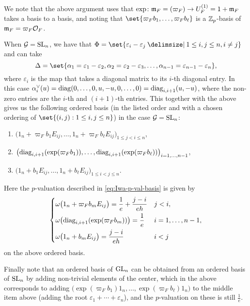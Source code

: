 We note that the above argument uses that $\exp \colon \mathfrak{m}_{F} = (\varpi_{F}) \to U_{F}^{(1)} = 1 + \mathfrak{m}_{F}$ takes a basis to a basis, and noting that $\set{ \varpi_{F}b_{1}, \dotsc, \varpi_{F}b_{\ell} }$ is a $\mathbb{Z}_{p}$-basis of $\mathfrak{m}_{F} = \varpi_{F}\mathcal{O}_{F}$. %

When $\mathcal{G} = \operatorname{SL}_{n}$, we have that $\Phi = \set{ \varepsilon_{i}-\varepsilon_{j} \given 1 \leq i,j \leq n, i\neq j }$ and can take
\begin{equation*}
  \Delta = \set{\alpha_{1}=\varepsilon_{1}-\varepsilon_{2}, \alpha_{2}=\varepsilon_{2}-\varepsilon_{3}, \dotsc, \alpha_{n-1}=\varepsilon_{n-1}-\varepsilon_{n}},
\end{equation*}
where $\varepsilon_{i}$ is the map that takes a diagonal matrix to its $i$-th diagonal entry. In this case $\alpha_{i}^{\vee}(u) = \operatorname{diag}(0,\dotsc,0,u,-u,0,\dotsc,0) = \operatorname{diag}_{i,i+1}(u,-u)$, where the non-zero entries are the $i$-th and $(i+1)$-th entries. This together with the above gives us the following ordered basis (in the listed order and with a chosen ordering of $\set{ (i,j) : 1 \leq i,j \leq n }$) in the case $\mathcal{G} = \operatorname{SL}_{n}$:
\begin{enumerate}[$\bullet$]
  \item $\bigl( 1_{n}+\varpi_{F}b_{1}E_{ij}, \dotsc, 1_{n}+\varpi_{F}b_{\ell}E_{ij} \bigr)_{1 \leq j < i \leq n}$,
  \item $\bigl( \operatorname{diag}_{i,i+1}(\exp(\varpi_{F}b_{1})), \dotsc, \operatorname{diag}_{i,i+1}(\exp(\varpi_{F}b_{\ell})) \bigr)_{i=1,\dotsc,n-1}$,
  \item $\bigl( 1_{n}+b_{1}E_{ij}, \dotsc, 1_{n}+b_{\ell}E_{ij} \bigr)_{1 \leq i < j \leq n}$.
\end{enumerate}
Here the $p$-valuation described in \eqref{eq:Iwa-p-val-basis} is given by
\begin{equation}\label{eq:Iwa-p-val-basis-SLn}
  \begin{dcases}
    \omega\bigl( 1_{n} + \varpi_{F}b_{m}E_{ij} \bigr) = \frac{1}{e} + \frac{j-i}{eh} & j < i, \\
    \omega\bigl( \operatorname{diag}_{i,i+1}(\exp(\varpi_{F}b_{m})) \bigr) = \frac{1}{e} & i = 1,\dotsc,n-1, \\
    \omega\bigl( 1_{n}+b_{m}E_{ij} \bigr) = \frac{j-i}{eh} & i < j
  \end{dcases}
\end{equation}
on the above ordered basis.

Finally note that an ordered basis of $\operatorname{GL}_{n}$ can be obtained from an ordered basis of $\operatorname{SL}_{n}$ by adding non-trivial elements of the center, which in the above corresponds to adding $\bigl(  \exp(\varpi_{F}b_{1})1_{n}, \dotsc, \exp(\varpi_{F}b_{\ell})1_{n} \bigr)$ to the middle item above (adding the root $\varepsilon_{1} + \dotsb + \varepsilon_{n}$), and the $p$-valuation on these is still $\frac{1}{e}$.

